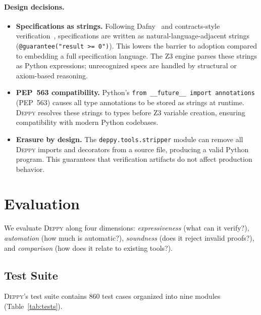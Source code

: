 \documentclass[acmsmall,nonacm,screen]{acmart}
\newcommand{\deppy}{\textsc{Deppy}}
\begin{document}
\paragraph{Design decisions.}
\begin{itemize}
\item \textbf{Specifications as strings.}  Following
  Dafny~\cite{dafny} and contracts-style
  verification~\cite{meyer1992}, specifications are written as
  natural-language-adjacent strings (\texttt{@guarantee("result >= 0")}).
  This lowers the barrier to adoption compared to embedding a full
  specification language.  The Z3 engine parses these strings as Python
  expressions; unrecognized specs are handled by structural or
  axiom-based reasoning.

\item \textbf{PEP~563 compatibility.}  Python's \texttt{from
    \_\_future\_\_ import annotations} (PEP~563) causes all type
  annotations to be stored as strings at runtime.  \deppy{} resolves
  these strings to types before Z3 variable creation, ensuring
  compatibility with modern Python codebases.

\item \textbf{Erasure by design.}  The \texttt{deppy.tools.stripper}
  module can remove all \deppy{} imports and decorators from a source
  file, producing a valid Python program.  This guarantees that
  verification artifacts do not affect production behavior.
\end{itemize}



\section{Evaluation}\label{sec:eval}

We evaluate \deppy{} along four dimensions: \emph{expressiveness}
(what can it verify?), \emph{automation} (how much is automatic?),
\emph{soundness} (does it reject invalid proofs?), and
\emph{comparison} (how does it relate to existing tools?).

\subsection{Test Suite}

\deppy{}'s test suite contains 860 test cases organized into nine
modules (Table~\ref{tab:tests}).
\end{document}
